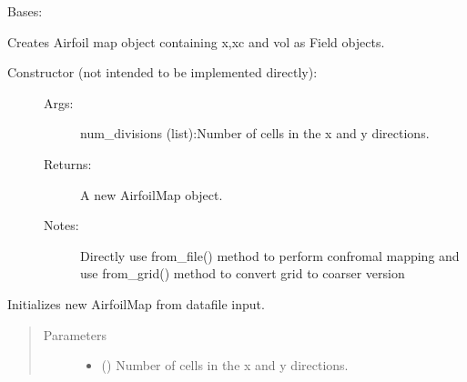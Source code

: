 \documentclass[letterpaper,10pt,english]{sphinxmanual}
\begin{document}
\begin{fulllineitems}
\label{\detokenize{autoapi/AirfoilMap/index:AirfoilMap.AirfoilMap}}
\sphinxAtStartPar
Bases: 

\sphinxAtStartPar
Creates Airfoil map object containing x,xc and vol as Field objects.
\begin{description}
\item[{Constructor (not intended to be implemented directly):}] \leavevmode\begin{description}
\item[{Args:}] \leavevmode
\sphinxAtStartPar
num\_divisions (list):Number of cells in the x and y directions.

\item[{Returns:}] \leavevmode
\sphinxAtStartPar
A new AirfoilMap object.

\item[{Notes:}] \leavevmode
\sphinxAtStartPar
Directly use from\_file() method to perform confromal mapping
and use from\_grid() method to convert grid to coarser version

\end{description}

\end{description}

\begin{fulllineitems}
\label{\detokenize{autoapi/AirfoilMap/index:AirfoilMap.AirfoilMap.from_file}}
\sphinxAtStartPar
Initializes new AirfoilMap from datafile input.
\begin{quote}\begin{description}
\item[{Parameters}] \leavevmode\begin{itemize}
\item {} 
\sphinxAtStartPar
{} () \textendash{} Number of cells in the x and y directions.


\end{itemize}
\end{description}
\end{quote}
\end{fulllineitems}
\end{fulllineitems}
\end{document}
